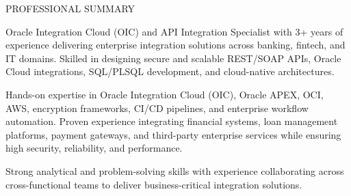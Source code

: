 \documentclass{resume}
\begin{document}

\begin{rSection}{PROFESSIONAL SUMMARY}

Oracle Integration Cloud (OIC) and API Integration Specialist with 3+ years of experience delivering enterprise integration solutions across banking, fintech, and IT domains. Skilled in designing secure and scalable REST/SOAP APIs, Oracle Cloud integrations, SQL/PLSQL development, and cloud-native architectures.

Hands-on expertise in Oracle Integration Cloud (OIC), Oracle APEX, OCI, AWS, encryption frameworks, CI/CD pipelines, and enterprise workflow automation. Proven experience integrating financial systems, loan management platforms, payment gateways, and third-party enterprise services while ensuring high security, reliability, and performance.

Strong analytical and problem-solving skills with experience collaborating across cross-functional teams to deliver business-critical integration solutions.

\end{rSection}

\end{document}
